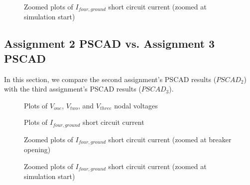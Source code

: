 \documentclass[10pt, oneside, letterpaper]{article}
\begin{document}
\begin{figure}[H]
    \begin{center}
        
    \end{center}
    \caption{Zoomed plots of $I_{four, ground}$ short circuit current (zoomed at simulation start)}
    \label{short_circuit_i_plots_zoom_2}
\end{figure}

\subsection{Assignment 2 PSCAD vs. Assignment 3 PSCAD}

In this section, we compare the second assignment's PSCAD results ($PSCAD_2$) with the third assignment's PSCAD results ($PSCAD_3$).

\begin{figure}[H]
    \begin{center}
        
    \end{center}
    \caption{Plots of $V_{one}$, $V_{two}$, and $V_{three}$ nodal voltages}
    \label{pscad_nodal_v_plots}
\end{figure}

\begin{figure}[H]
    \begin{center}
        
    \end{center}
    \caption{Plots of $I_{four, ground}$ short circuit current}
    \label{pscad_short_circuit_i_plots}
\end{figure}

\begin{figure}[H]
    \begin{center}
        
    \end{center}
    \caption{Zoomed plots of $I_{four, ground}$ short circuit current (zoomed at breaker opening)}
    \label{pscad_short_circuit_i_plots_zoom_1}
\end{figure}

\begin{figure}[H]
    \begin{center}
        
    \end{center}
    \caption{Zoomed plots of $I_{four, ground}$ short circuit current (zoomed at simulation start)}
    \label{pscad_short_circuit_i_plots_zoom_2}
\end{figure}
\end{document}
